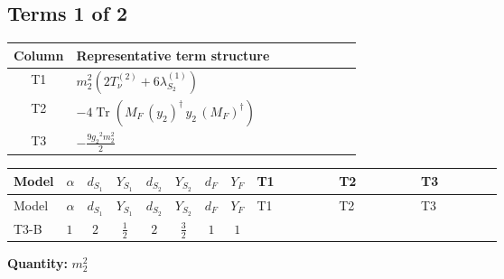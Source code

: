 \documentclass[8pt]{article}
\begin{document}
\begin{landscape}
\subsection*{Terms 1 of 2}
\begin{center}
\begin{tabular}{@{}c >{\raggedright\arraybackslash}p{0.82\linewidth}@{}}
\toprule
Column & Representative term structure \\
\midrule
T1 & \(\displaystyle {m_2^2} (2 T_{\nu}^{(2)}+6 {\lambda_{S_2}^{(1)}})\) \\
\midrule
T2 & \(\displaystyle -4 \operatorname{Tr}\!\left({M_F}\,\left({y_2}\right)^{\dagger}\,{y_2}\,\left({M_F}\right)^{\dagger}\right)\) \\
\midrule
T3 & \(\displaystyle -\frac{9 {g_2}^2 {m_2^2}}{2}\) \\
\midrule
\bottomrule
\end{tabular}
\end{center}
\smallskip
\tiny
\begin{longtable}{@{}llcccccc >{\raggedright\arraybackslash}p{0.21\linewidth} >{\raggedright\arraybackslash}p{0.21\linewidth} >{\raggedright\arraybackslash}p{0.21\linewidth}@{}}
\toprule
Model & $\alpha$ & $d_{S_1}$ & $Y_{S_1}$ & $d_{S_2}$ & $Y_{S_2}$ & $d_F$ & $Y_F$ & T1 & T2 & T3 \\
\midrule
\endfirsthead
\toprule
Model & $\alpha$ & $d_{S_1}$ & $Y_{S_1}$ & $d_{S_2}$ & $Y_{S_2}$ & $d_F$ & $Y_F$ & T1 & T2 & T3 \\
\midrule
\endhead
T3-B & $1$ & $2$ & $\frac{1}{2}$ & $2$ & $\frac{3}{2}$ & $1$ & $1$ & \scriptsize\adjustbox{max width=\linewidth}{$\begin{gathered} {m_2^2} (2 T_{\nu}^{(2)}+6 {\lambda_{S_2}^{(1)}})\end{gathered}$} & \scriptsize\adjustbox{max width=\linewidth}{$\begin{gathered} -4 \operatorname{Tr}\!\left({M_F}\,\left({y_2}\right)^{\dagger}\,{y_2}\,\left({M_F}\right)^{\dagger}\right)\end{gathered}$} & \scriptsize\adjustbox{max width=\linewidth}{$\begin{gathered} -\frac{9 {g_2}^2 {m_2^2}}{2}\end{gathered}$} \\
\midrule
\bottomrule
\end{longtable}
\clearpage
\noindent\textbf{Quantity: }$m_2^2$\par\smallskip

\end{landscape}
\end{document}
